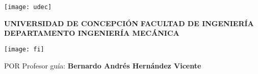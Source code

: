 \begin{titlepage}
\parbox{1.5cm}{
	\texttt{[image: udec]}
}
\hfill
\parbox[c][2cm]{0.7\textwidth}{
	\centering
	\textbf{UNIVERSIDAD DE CONCEPCIÓN}
	\vfill
	\textbf{FACULTAD DE INGENIERÍA}
	\vfill
	\textbf{DEPARTAMENTO INGENIERÍA MECÁNICA}
}
\hfill 
\parbox{1.5cm}{
	\texttt{[image: fi]}
}
\smallskip
\vspace*{5cm}
\centering
\textbf{\@title}
\bigbreak
POR
\bigbreak
\textbf{\@author}
\vfill
Profesor guía:
\medbreak
\textbf{Bernardo Andrés Hernández Vicente}
\vfill
\@date
\end{titlepage}